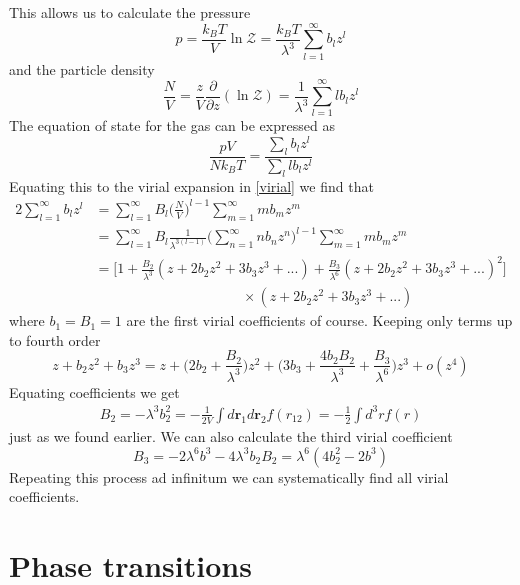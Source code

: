 \documentclass[a4paper,11pt,oneside]{book}
\begin{document}
This allows us to calculate the pressure
\begin{equation}
    p = \frac{k_B T}{V} \ln \mathcal{Z} = \frac{k_B T}{\lambda^3} \sum_{l=1}^\infty b_l z^l
\end{equation}
and the particle density
\begin{equation}
    \frac{N}{V} = \frac{z}{V}\frac{\partial}{\partial z}(\ln \mathcal{Z}) = \frac{1}{\lambda^3} \sum_{l=1}^\infty lb_lz^l
\end{equation}
The equation of state for the gas can be expressed as
\begin{equation}
    \frac{pV}{Nk_B T} = \frac{\sum_l b_l z^l}{\sum_l l b_lz^l}
\end{equation}
Equating this to the virial expansion in \eqref{virial} we find that
\begin{alignat}{2}
    \sum_{l=1}^\infty b_l z^l &= \sum_{l=1}^\infty B_l\bigg(\frac{N}{V}\bigg)^{l-1} \sum_{m=1}^\infty m b_m z^m\\
    &=\sum_{l=1}^\infty B_l\frac{1}{\lambda^{3(l-1)}} \bigg(\sum_{n=1}^\infty nb_nz^n\bigg)^{l-1} \sum_{m=1}^\infty m b_m z^m\\
    &=\bigg[1+\frac{B_2}{\lambda^3}(z+2b_2z^2+3b_3z^3+...)+\frac{B_3}{\lambda^6}(z+2b_2z^2+3b_3z^3+...)^2\bigg]\\ \nonumber
    &\quad \hspace{4cm} \times (z+2b_2z^2+3b_3z^3+...)
\end{alignat}
where $b_1=B_1=1$ are the first virial coefficients of course. Keeping only terms up to fourth order
\begin{equation}
    z+b_2z^2+b_3z^3 = z+\bigg(2b_2+\frac{B_2}{\lambda^3}\bigg)z^2+\bigg(3b_3+\frac{4b_2B_2}{\lambda^3}+\frac{B_3}{\lambda^6}\bigg)z^3+o(z^4)
\end{equation}
Equating coefficients we get
\begin{align}
    B_2 = -\lambda^3 b_2^2 = -\frac{1}{2V} \int d\textbf{r}_1d\textbf{r}_2f(r_{12}) = -\frac{1}{2}\int d^3r f(r)
\end{align}
just as we found earlier. We can also calculate the third virial coefficient
\begin{equation}
    B_3 = -2\lambda^6 b^3 - 4\lambda^3b_2B_2 = \lambda^6(4b_2^2-2b^3)
\end{equation}
Repeating this process ad infinitum we can systematically find all virial coefficients.
\chapter{Phase transitions}
\end{document}
